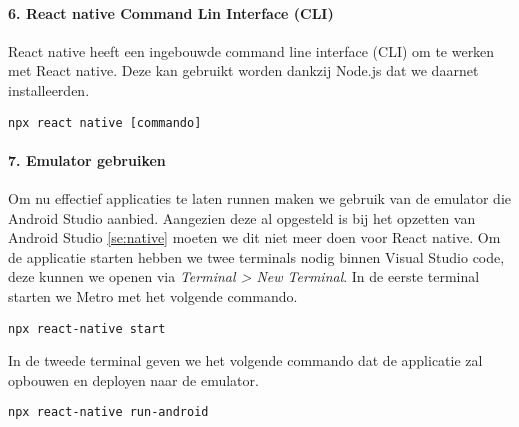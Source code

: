 \paragraph{6. React native Command Lin Interface (CLI)}
React native heeft een ingebouwde command line interface (CLI) om te werken met React native. 
Deze kan gebruikt worden dankzij Node.js dat we daarnet installeerden.
\begin{verbatim}
npx react native [commando]
\end{verbatim}

\paragraph{7. Emulator gebruiken}
Om nu effectief applicaties te laten runnen maken we gebruik van de emulator die Android Studio aanbied. 
Aangezien deze al opgesteld is bij het opzetten van Android Studio \ref{se:native} 
moeten we dit niet meer doen voor React native. Om de applicatie starten hebben we twee terminals nodig 
binnen Visual Studio code, deze kunnen we openen via \textit{Terminal > New Terminal}. 
In de eerste terminal starten we \gls{Metro} met het volgende commando.
\begin{verbatim}
npx react-native start
\end{verbatim}
In de tweede terminal geven we het volgende commando dat de applicatie zal opbouwen en 
deployen naar de emulator.
\begin{verbatim}
npx react-native run-android
\end{verbatim}


